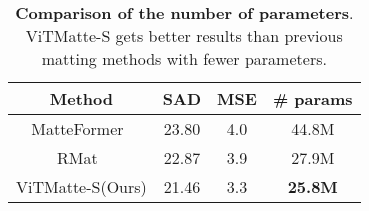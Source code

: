 \documentclass[10pt,twocolumn,letterpaper]{article}
\newcommand{\thename}{ViTMatte}
\begin{document}
\begin{table}[tbp]
\renewcommand{\arraystretch}{1.1}
\centering
{}
\caption{\textbf{Quantitative results on Distinctions-646}.}
\label{distinctions-646}
\end{table}

\begin{table}[tbp]
\renewcommand{\arraystretch}{1.1}
\centering
\begin{tabular}{c|ccc}
\toprule
Method          & SAD &MSE & \# params \\
\midrule
MatteFormer~\cite{matteformer}               & 23.80          & 4.0          & 44.8M           \\
RMat~\cite{rmat}                      & 22.87          & 3.9          & 27.9M           \\
\midrule
ViTMatte-S(Ours) & 21.46 & 3.3 & \textbf{25.8M}  \\
\bottomrule
\end{tabular}
\caption{\textbf{Comparison of the number of parameters}. \thename{}-S gets better results than previous matting methods with fewer parameters.}
\label{pp-trade-off}
\end{table}
\end{document}
